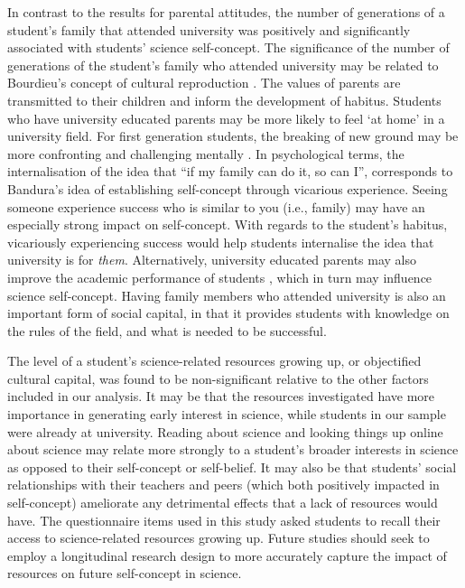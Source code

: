 In contrast to the results for parental attitudes, the number of generations of a student's family that attended university was positively and significantly associated with students' science self-concept. The significance of the number of generations of the student's family who attended university may be related to Bourdieu's concept of cultural reproduction \citep{Dimaggio1982}. The values of parents are transmitted to their children and inform the development of habitus. Students who have university educated parents may be more likely to feel `at home' in a university field. For first generation students, the breaking of new ground may be more confronting and challenging mentally \citep{gardner2011those}. In psychological terms, the internalisation of the idea that ``if my family can do it, so can I'', corresponds to Bandura's \citep{bandura1986explanatory} idea of establishing self-concept through vicarious experience. Seeing someone experience success who is similar to you (i.e., family) may have an especially strong impact on self-concept. With regards to the student's habitus, vicariously experiencing success would help students internalise the idea that university is for \textit{them}. Alternatively, university educated parents may also improve the academic performance of students \citep{paul2011cultural}, which in turn may influence science self-concept. Having family members who attended university is also an important form of social capital, in that it provides students with knowledge on the rules of the field, and what is needed to be successful.

The level of a student's science-related resources growing up, or objectified cultural capital, was found to be non-significant relative to the other factors included in our analysis. It may be that the resources investigated have more importance in generating early interest in science, while students in our sample were already at university. Reading about science and looking things up online about science may relate more strongly to a student's broader interests in science as opposed to their self-concept or self-belief. It may also be that students' social relationships with their teachers and peers (which both positively impacted in self-concept) ameliorate any detrimental effects that a lack of resources would have. The questionnaire items used in this study asked students to recall their access to science-related resources growing up. Future studies should seek to employ a longitudinal research design to more accurately capture the impact of resources on future self-concept in science. 

